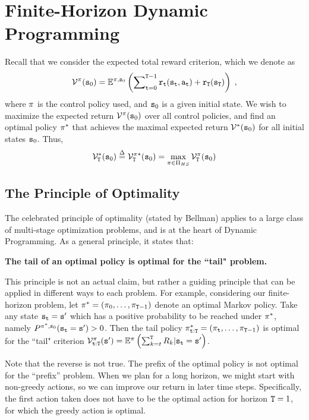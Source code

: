 \section{Finite-Horizon Dynamic Programming}

Recall that we consider the expected total reward criterion, which we denote as
\[{\mathcal{V}^\pi }({{\tt s}_0}) = {\mathbb{E}^{\pi ,{{\tt s}_0}}}\left( {\sum\nolimits_{{\tt t} = 0}^{{\tt T} -1} {{{\tt r}_{\tt t}}({{\tt s}_{\tt t}},{{\tt a}_{\tt t}}) + {{\tt r}_{\tt T}}({{\tt s}_{\tt T}})} } \right)\;,\]
where $\pi $ is the control policy used, and ${{\tt s}_0}$ is a
given initial state. We wish to maximize the expected return
${\mathcal{V}^\pi }({{\tt s}_0})$ over all control policies, and find
an optimal policy ${\pi ^*}$ that achieves the maximal expected
return ${\mathcal{V}^*}({{\tt s}_0})$ for all initial states ${{\tt s}_0}$.
Thus,
\[{\Value^*_\tHorizon}({\state_0}) \buildrel \Delta \over = {\Value^{\policy *}_\tHorizon}({\state_0}) = \mathop {\max }\limits_{\policy  \in {\Pi _{HS}}} {\Value^\policy_\tHorizon }({\state_0})\]


\subsection{The Principle of Optimality}
The celebrated principle of optimality (stated by Bellman) applies
to a large class of multi-stage optimization problems, and is at the
heart of Dynamic Programming. As a general principle, it states
that:
\begin{center}
\textbf{The tail of an optimal policy is optimal for the ``tail"
problem.}
\end{center}

This principle is not an actual claim, but rather a guiding
principle that can be applied in different ways to each problem. For
example, considering our finite-horizon problem, let ${\pi ^*} =
({\pi _0}, \ldots ,{\pi _{{\tt T} -1}})$ denote an optimal
Markov policy. Take any state ${{\tt s}_{\tt t}} = {\tt s}'$ which has
a positive probability to be reached under ${\pi ^*}$, namely
${P^{\pi^* ,{{\tt s}_0}}}({{\tt s}_{\tt t}} = {\tt s}')
> 0$. Then the tail policy $\pi^*_{{\tt t}:{\tt T}}=({\pi _{\tt t}}, \ldots ,{\pi _{{\tt T} -1}})$ is optimal for the ``tail" criterion $\mathcal{V}_{{\tt t}:{\tt T}}^\pi
({\tt s}') = {\mathbb{E}^\pi }\left( {\sum\nolimits_{k = t}^{\tt T}
{{R_k}|{{\tt s}_{\tt t}} = {\tt s}'} } \right)$.

Note that the reverse is not true. The prefix of the optimal policy
is not optimal for the ``prefix'' problem. When we plan for a long
horizon, we might start with non-greedy actions, so we can improve
our return in later time steps. Specifically, the first action taken
does not have to be the optimal action for horizon ${\tt T}=1$,
for which the greedy action is optimal.


